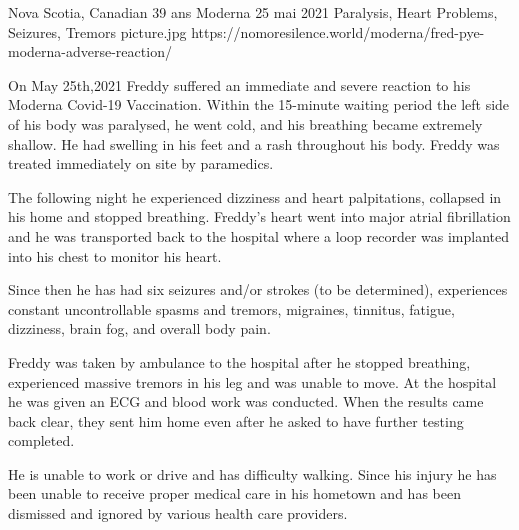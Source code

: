           {Nova Scotia, Canadian}
          {39 ans}
          {Moderna}
          {25 mai 2021}
          {
            Paralysis,
            Heart Problems,
            Seizures,
            Tremors
          }
          {picture.jpg}
          {https://nomoresilence.world/moderna/fred-pye-moderna-adverse-reaction/}
          {

On May 25th,2021 Freddy suffered an immediate and severe reaction to his Moderna
Covid-19 Vaccination. Within the 15-minute waiting period the left side of his
body was paralysed, he went cold, and his breathing became extremely shallow. He
had swelling in his feet and a rash throughout his body. Freddy was treated
immediately on site by paramedics.

The following night he experienced dizziness and heart palpitations, collapsed
in his home and stopped breathing. Freddy's heart went into major atrial
fibrillation and he was transported back to the hospital where a loop recorder
was implanted into his chest to monitor his heart.

Since then he has had six seizures and/or strokes (to be determined),
experiences constant uncontrollable spasms and tremors, migraines, tinnitus,
fatigue, dizziness, brain fog, and overall body pain.

Freddy was taken by ambulance to the hospital after he stopped breathing,
experienced massive tremors in his leg and was unable to move. At the hospital
he was given an ECG and blood work was conducted. When the results came back
clear, they sent him home even after he asked to have further testing completed.

He is unable to work or drive and has difficulty walking. Since his injury he
has been unable to receive proper medical care in his hometown and has been
dismissed and ignored by various health care providers.

}
